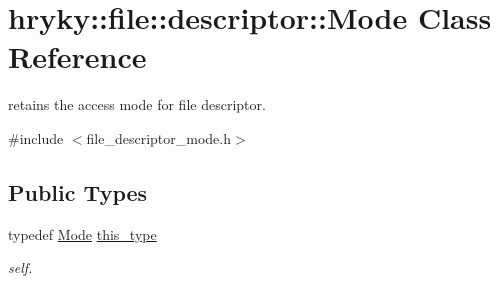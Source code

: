 \hypertarget{classhryky_1_1file_1_1descriptor_1_1_mode}{\section{hryky\-:\-:file\-:\-:descriptor\-:\-:Mode Class Reference}
\label{classhryky_1_1file_1_1descriptor_1_1_mode}
}


retains the access mode for file descriptor.  




{\ttfamily \#include $<$file\-\_\-descriptor\-\_\-mode.\-h$>$}

\subsection*{Public Types}
\begin{DoxyCompactItemize}
\item 
\hypertarget{classhryky_1_1file_1_1descriptor_1_1_mode_a06dd006ab194ebabae7e2b324246df44}{typedef \hyperlink{classhryky_1_1file_1_1descriptor_1_1_mode}{Mode} \hyperlink{classhryky_1_1file_1_1descriptor_1_1_mode_a06dd006ab194ebabae7e2b324246df44}{this\-\_\-type}}\label{classhryky_1_1file_1_1descriptor_1_1_mode_a06dd006ab194ebabae7e2b324246df44}

\begin{DoxyCompactList}\small\item\em self. \end{DoxyCompactList}\end{DoxyCompactItemize}
